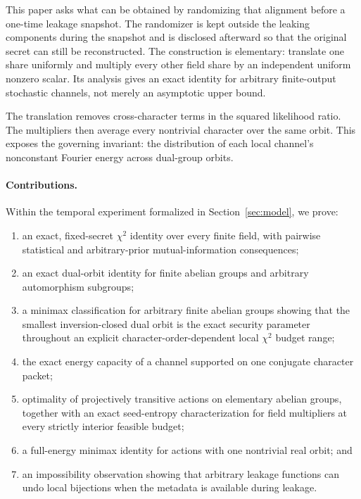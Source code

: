 \documentclass[11pt]{article}
\theoremstyle{definition}
\newcommand{\chitwo}{\chi^2}
\begin{document}
This paper asks what can be obtained by randomizing that alignment before a
one-time leakage snapshot.  The randomizer is kept outside the leaking components
during the snapshot and is disclosed afterward so that the original secret can
still be reconstructed.  The construction is elementary: translate one share
uniformly and multiply every other field share by an independent uniform nonzero
scalar.  Its analysis gives an exact identity for arbitrary finite-output
stochastic channels, not merely an asymptotic upper bound.

The translation removes cross-character terms in the squared likelihood ratio.
The multipliers then average every nontrivial character over the same orbit.
This exposes the governing invariant: the distribution of each local channel's
nonconstant Fourier energy across dual-group orbits.

\paragraph{Contributions.}
Within the temporal experiment formalized in Section~\ref{sec:model}, we prove:
\begin{enumerate}
    \item an exact, fixed-secret $\chitwo$ identity over every finite field,
          with pairwise statistical and arbitrary-prior mutual-information
          consequences;
    \item an exact dual-orbit identity for finite abelian groups and arbitrary
          automorphism subgroups;
    \item a minimax classification for arbitrary finite abelian groups showing
          that the smallest inversion-closed dual orbit is the exact security
          parameter throughout an explicit character-order-dependent local
          $\chitwo$ budget range;
    \item the exact energy capacity of a channel supported on one conjugate
          character packet;
    \item optimality of projectively transitive actions on elementary abelian
          groups, together with an exact seed-entropy characterization for field
          multipliers at every strictly interior feasible budget;
    \item a full-energy minimax identity for actions with one nontrivial real
          orbit; and
    \item an impossibility observation showing that arbitrary leakage functions
          can undo local bijections when the metadata is available during leakage.
\end{enumerate}
\end{document}

